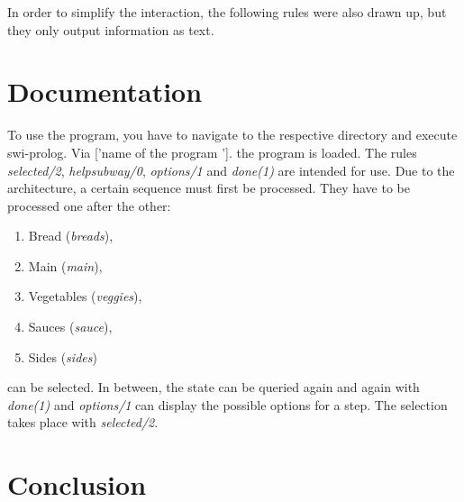 \documentclass{article}
\begin{document}
	
	
	In order to simplify the interaction, the following rules were also drawn up, but they only output information as text.
	
	
	
	\section{Documentation}
	
	To use the program, you have to navigate to the respective directory and execute swi-prolog. Via ['name of the program ']. the program is loaded. The rules \textit{selected/2}, \textit{helpsubway/0}, \textit{options/1} and \textit{done(1)} are intended for use. Due to the architecture, a certain sequence must first be processed. They have to be processed one after the other:
	\begin{enumerate}
		\item Bread (\textit{breads}),
		\item Main (\textit{main}), 
		\item Vegetables (\textit{veggies}), 
		\item Sauces (\textit{sauce}),
		\item Sides (\textit{sides})
	\end{enumerate}
	 can be selected. In between, the state can be queried again and again with \textit{done(1)} and \textit{options/1} can display the possible options for a step. The selection takes place with \textit{selected/2}.
	
	\section{Conclusion}
\end{document}
